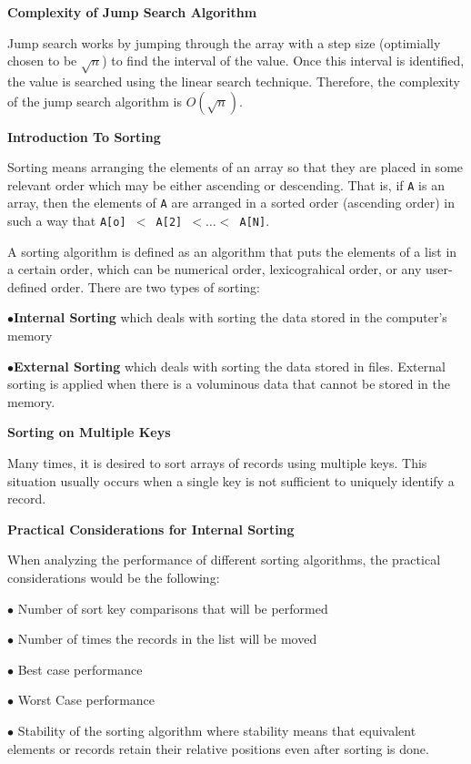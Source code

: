 \vskip 3mm
{\bf Complexity of Jump Search Algorithm}

\vskip 1mm
Jump search works by jumping through the array with a step size (optimially chosen to be $\sqrt{n}$) to find the interval of the value. Once this interval is identified, the value is searched using the linear search technique. Therefore, the complexity of the jump search algorithm is $O(\sqrt{n})$.

\filbreak
\vskip 1cm
{\bf Introduction To Sorting}

\vskip 1mm
Sorting means arranging the elements of an array so that they are placed in some relevant order which may be either ascending or descending. That is, if {\tt A} is an array, then the elements of {\tt A} are arranged in a sorted order (ascending order) in such a way that {\tt A[o] $<$ A[2] $<\ldots<$ A[N]}.

\vskip 1mm
A sorting algorithm is defined as an algorithm that puts the elements of a list in a certain order, which can be numerical order, lexicograhical order, or any user-defined order. There are two types of sorting:

\vskip 3mm
\qquad$\bullet${\bf Internal Sorting} which deals with sorting the data stored in the computer's memory

\vskip 3mm
\qquad$\bullet${\bf External Sorting} which deals with sorting the data stored in files. External sorting is applied when there is a voluminous data that cannot be stored in the memory.

\vskip 3mm
{\bf Sorting on Multiple Keys}

\vskip 1mm
Many times, it is desired to sort arrays of records using multiple keys. This situation usually occurs when a single key is not sufficient to uniquely identify a record.

\vskip 3mm
{\bf Practical Considerations for Internal Sorting}

\vskip 1mm
When analyzing the performance of different sorting algorithms, the practical considerations would be the following:

\vskip 3mm
\qquad$\bullet$ Number of sort key comparisons that will be performed

\vskip 3mm
\qquad$\bullet$ Number of times the records in the list will be moved

\vskip 3mm
\qquad$\bullet$ Best case performance

\vskip 3mm
\qquad$\bullet$ Worst Case performance

\vskip 3mm
\qquad$\bullet$ Stability of the sorting algorithm where stability means that equivalent elements or records retain their relative positions even after sorting is done.

